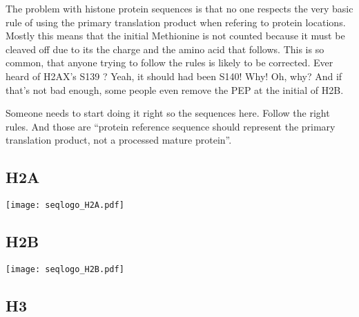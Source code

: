     The problem with histone protein sequences is that no one respects the very
    basic rule of using the primary translation product when refering to protein
    locations. Mostly this means that the initial Methionine is not counted because
    it must be cleaved off due to its the charge and the amino acid that follows.
    This is so common, that anyone trying to follow the rules is likely to be corrected.
    Ever heard of H2AX's S139 ? Yeah, it should had been S140! Why! Oh, why?
    And if that's not bad enough, some people even remove the PEP at the initial
    of H2B.

    Someone needs to start doing it right so the sequences here. Follow the right
    rules. And those are ``protein reference sequence should represent the primary
    translation product, not a processed mature protein''\citep{desc-seq-variant}.

  \subsection{H2A}
    \begin{TableAndFigure*}
      \label{tab:H2A-consensus}
      

      \texttt{[image: seqlogo\_H2A.pdf]}
      \label{fig:H2A-weblogo}
    \end{TableAndFigure*}


  \subsection{H2B}
    \begin{TableAndFigure*}
      \label{tab:H2B-consensus}
      

      \texttt{[image: seqlogo\_H2B.pdf]}
      \label{fig:H2B-weblogo}
    \end{TableAndFigure*}

  \subsection{H3}

